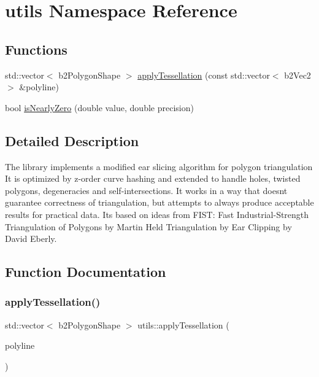 \hypertarget{namespaceutils}{}\section{utils Namespace Reference}
\label{namespaceutils}
\subsection*{Functions}
\begin{DoxyCompactItemize}
\item 
std\+::vector$<$ b2\+Polygon\+Shape $>$ \hyperlink{namespaceutils_ad56cbd0c7a6e813a5dd523bbaabb55a4}{apply\+Tessellation} (const std\+::vector$<$ b2\+Vec2 $>$ \&polyline)
\item 
bool \hyperlink{namespaceutils_a1fe70cdae64372e591da8985d7a884d6}{is\+Nearly\+Zero} (double value, double precision)
\end{DoxyCompactItemize}


\subsection{Detailed Description}
The library implements a modified ear slicing algorithm for polygon triangulation It is optimized by z-\/order curve hashing and extended to handle holes, twisted polygons, degeneracies and self-\/intersections. It works in a way that doesn\textquotesingle{}t guarantee correctness of triangulation, but attempts to always produce acceptable results for practical data. It\textquotesingle{}s based on ideas from F\+I\+ST\+: Fast Industrial-\/\+Strength Triangulation of Polygons by Martin Held Triangulation by Ear Clipping by David Eberly. 

\subsection{Function Documentation}
\mbox{\label{namespaceutils_ad56cbd0c7a6e813a5dd523bbaabb55a4}} 
\subsubsection{\texorpdfstring{apply\+Tessellation()}{applyTessellation()}}
{\footnotesize\ttfamily std\+::vector$<$ b2\+Polygon\+Shape $>$ utils\+::apply\+Tessellation (\begin{DoxyParamCaption}\item[{const std\+::vector$<$ b2\+Vec2 $>$ \&}]{polyline }\end{DoxyParamCaption})}



